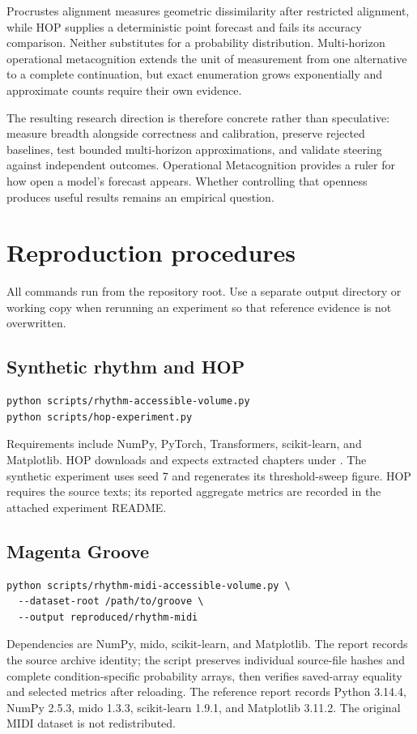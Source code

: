 \documentclass[11pt,a4paper]{article}
\begin{document}
Procrustes alignment measures geometric dissimilarity after restricted alignment, while HOP supplies a deterministic point forecast and fails its accuracy comparison. Neither substitutes for a probability distribution. Multi-horizon operational metacognition extends the unit of measurement from one alternative to a complete continuation, but exact enumeration grows exponentially and approximate counts require their own evidence.

The resulting research direction is therefore concrete rather than speculative: measure breadth alongside correctness and calibration, preserve rejected baselines, test bounded multi-horizon approximations, and validate steering against independent outcomes. Operational Metacognition provides a ruler for how open a model's forecast appears. Whether controlling that openness produces useful results remains an empirical question.

\appendix
\section{Reproduction procedures}
All commands run from the repository root. Use a separate output directory or working copy when rerunning an experiment so that reference evidence is not overwritten.

\subsection{Synthetic rhythm and HOP}
\begin{lstlisting}
python scripts/rhythm-accessible-volume.py
python scripts/hop-experiment.py
\end{lstlisting}
Requirements include NumPy, PyTorch, Transformers, scikit-learn, and Matplotlib. HOP downloads  and expects extracted chapters under . The synthetic experiment uses seed 7 and regenerates its threshold-sweep figure. HOP requires the source texts; its reported aggregate metrics are recorded in the attached experiment README.

\subsection{Magenta Groove}
\begin{lstlisting}
python scripts/rhythm-midi-accessible-volume.py \
  --dataset-root /path/to/groove \
  --output reproduced/rhythm-midi
\end{lstlisting}
Dependencies are NumPy, mido, scikit-learn, and Matplotlib. The report records the source archive identity; the script preserves individual source-file hashes and complete condition-specific probability arrays, then verifies saved-array equality and selected metrics after reloading. The reference report records Python 3.14.4, NumPy 2.5.3, mido 1.3.3, scikit-learn 1.9.1, and Matplotlib 3.11.2. The original MIDI dataset is not redistributed.
\end{document}
